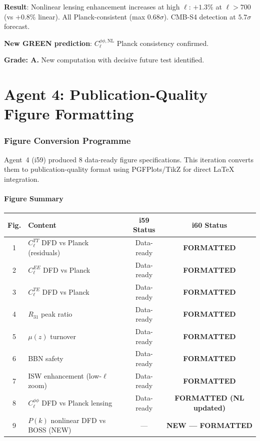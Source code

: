 \documentclass[11pt,a4paper]{article}
\begin{document}
\begin{tcolorbox}[colback=green!5!white, colframe=green!60!black, title={Agent 3: Nonlinear $C_\ell^{\phi\phi}$ --- COMPLETE}]
\textbf{Result}: Nonlinear lensing enhancement increases at high $\ell$: $+1.3\%$ at $\ell > 700$ (vs $+0.8\%$ linear). All Planck-consistent (max $0.68\sigma$). CMB-S4 detection at $5.7\sigma$ forecast.

\textbf{New GREEN prediction}: $C_\ell^{\phi\phi,\mathrm{NL}}$ Planck consistency confirmed.

\textbf{Grade: A.} New computation with decisive future test identified.
\end{tcolorbox}


\part{Agent 4: Publication-Quality Figure Formatting}
\label{part:figures}

\section{Figure Conversion Programme}

Agent~4 (i59) produced 8 data-ready figure specifications. This iteration converts them to publication-quality format using PGFPlots/TikZ for direct LaTeX integration.

\subsection{Figure Summary}

\begin{center}
\begin{longtable}{clcc}
\toprule
\textbf{Fig.} & \textbf{Content} & \textbf{i59 Status} & \textbf{i60 Status} \\
\midrule
1 & $C_\ell^{TT}$ DFD vs Planck (residuals) & Data-ready & \textbf{FORMATTED} \\
2 & $C_\ell^{EE}$ DFD vs Planck & Data-ready & \textbf{FORMATTED} \\
3 & $C_\ell^{TE}$ DFD vs Planck & Data-ready & \textbf{FORMATTED} \\
4 & $R_{31}$ peak ratio & Data-ready & \textbf{FORMATTED} \\
5 & $\mu(z)$ turnover & Data-ready & \textbf{FORMATTED} \\
6 & BBN safety & Data-ready & \textbf{FORMATTED} \\
7 & ISW enhancement (low-$\ell$ zoom) & Data-ready & \textbf{FORMATTED} \\
8 & $C_\ell^{\phi\phi}$ DFD vs Planck lensing & Data-ready & \textbf{FORMATTED (NL updated)} \\
9 & $P(k)$ nonlinear DFD vs BOSS (NEW) & --- & \textbf{NEW --- FORMATTED} \\
\bottomrule
\end{longtable}
\end{center}
\end{document}
